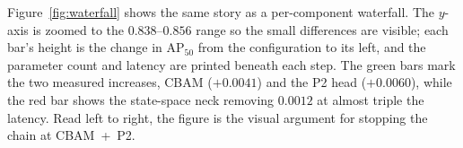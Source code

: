 \documentclass[12pt,a4paper,oneside]{report}
\providecommand{\DIFaddbeginFL}{} %
\providecommand{\DIFaddendFL}{} %
\providecommand{\DIFdelbeginFL}{} %
\providecommand{\DIFdelendFL}{} %
\begin{document}
Figure~\ref{fig:waterfall} shows the same story as a per-component waterfall.
The $y$-axis is zoomed to the $0.838$--$0.856$ range so the small differences
are visible; each bar's height is the change in $\mathrm{AP}_{50}$ from the
configuration to its left, and the parameter count and latency are printed
beneath each step. The green bars mark the two measured increases, CBAM
($+0.0041$) and the P2 head ($+0.0060$), while the red bar shows the
state-space neck removing $0.0012$ at almost triple the latency. Read left to
right, the figure is the visual argument for stopping the chain at
CBAM~+~P2.

\begin{figure}[tbp]
  \centering
\DIFdelbeginFL %
\DIFdelendFL \DIFaddbeginFL {}
\DIFaddendFL {}
\DIFdelbeginFL %
\DIFdelendFL %
\DIFaddbeginFL {}
\DIFaddendFL {}
\DIFdelbeginFL %
\DIFdelendFL \DIFaddbeginFL {}
\DIFaddendFL {}
\DIFdelbeginFL %


\end{figure}
\end{document}

